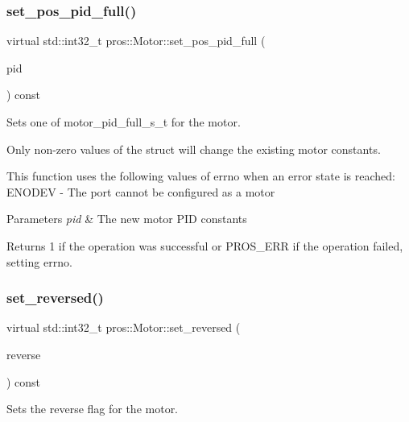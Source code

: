 \subsubsection{\texorpdfstring{set\+\_\+pos\+\_\+pid\+\_\+full()}{set\_pos\_pid\_full()}}
{\footnotesize\ttfamily virtual std\+::int32\+\_\+t pros\+::\+Motor\+::set\+\_\+pos\+\_\+pid\+\_\+full (\begin{DoxyParamCaption}\item[{const \hyperlink{motors_8h_a0295cbf49f5c70c17b5fa962bd25febd}{motor\+\_\+pid\+\_\+full\+\_\+s\+\_\+t}}]{pid }\end{DoxyParamCaption}) const\hspace{0.3cm}{\ttfamily [virtual]}}

Sets one of motor\+\_\+pid\+\_\+full\+\_\+s\+\_\+t for the motor.

Only non-\/zero values of the struct will change the existing motor constants.

This function uses the following values of errno when an error state is reached\+: E\+N\+O\+D\+EV -\/ The port cannot be configured as a motor


\begin{DoxyParams}{Parameters}
{\em pid} & The new motor P\+ID constants\\
\hline
\end{DoxyParams}
\begin{DoxyReturn}{Returns}
1 if the operation was successful or P\+R\+O\+S\+\_\+\+E\+RR if the operation failed, setting errno. 
\end{DoxyReturn}
\mbox{\label{classpros_1_1Motor_a44fcc6447ed1416e880232baa16a221e}} 
\subsubsection{\texorpdfstring{set\+\_\+reversed()}{set\_reversed()}}
{\footnotesize\ttfamily virtual std\+::int32\+\_\+t pros\+::\+Motor\+::set\+\_\+reversed (\begin{DoxyParamCaption}\item[{const bool}]{reverse }\end{DoxyParamCaption}) const\hspace{0.3cm}{\ttfamily [virtual]}}

Sets the reverse flag for the motor.

